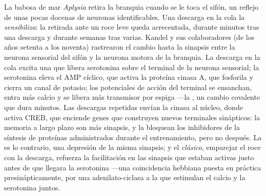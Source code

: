 \begin{proposition}\label{prop:b3:learning-memory:aplysia}
La babosa de mar \emph{Aplysia} retira la branquia cuando se le toca el
sifón, un reflejo de unas pocas docenas de neuronas identificables. Una
descarga en la cola la \emph{sensibiliza}: la retirada ante un roce
leve queda acrecentada, durante minutos tras una descarga y durante
semanas tras varias. Kandel y sus colaboradores (de los años setenta a
los noventa) rastrearon el cambio hasta la sinapsis entre la neurona
sensorial del sifón y la neurona motora de la branquia. La descarga en
la cola excita una  que libera serotonina sobre el terminal
de la neurona sensorial; la serotonina eleva el AMP cíclico, que activa
la proteína cinasa A, que fosforila y cierra un canal de potasio; los
potenciales de acción del terminal se ensanchan, entra más calcio y se
libera más transmisor por espiga ---la \emph{}, un cambio covalente que dura minutos. Las descargas
repetidas envían la cinasa al núcleo, donde activa CREB, que enciende
genes que construyen nuevos terminales sinápticos: la memoria a largo
plazo son más sinapsis, y la bloquean los inhibidores de la síntesis de
proteínas administrados durante el entrenamiento, pero no después. La
\emph{} es lo contrario, una depresión de la misma sinapsis;
y el \emph{ clásico}, emparejar el roce con la
descarga, refuerza la facilitación en las sinapsis que estaban activas
justo antes de que llegara la serotonina ---una coincidencia hebbiana
puesta en práctica presinápticamente, por una adenilato-ciclasa a la
que estimulan el calcio y la serotonina juntos.
\end{proposition}

